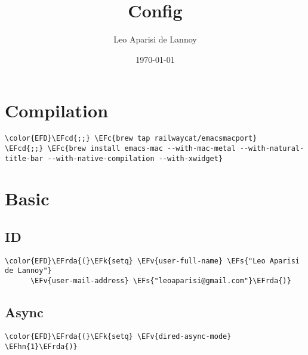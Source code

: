 \documentclass[12pt]{article}
\author{Leo Aparisi de Lannoy}
\date{\today}
\title{Config}
\theoremstyle{plain}%
\theoremstyle{definition}
\theoremstyle{remark}
\newcommand{\EFc}[1]{\textcolor{EFc}{#1}} %
\newcommand{\EFcd}[1]{\textcolor{EFcd}{#1}} %
\newcommand{\EFs}[1]{\textcolor{EFs}{#1}} %
\newcommand{\EFk}[1]{\textcolor{EFk}{#1}} %
\newcommand{\EFv}[1]{\textcolor{EFv}{#1}} %
\newcommand{\EFhn}[1]{\textcolor{EFhn}{\textbf{#1}}} %
\newcommand{\EFrda}[1]{\textcolor{EFrda}{#1}} %
\begin{document}
\maketitle
\tableofcontents

\section{Compilation}
\label{sec:org1126170}
\begin{Code}
\begin{Verbatim}
\color{EFD}\EFcd{;;} \EFc{brew tap railwaycat/emacsmacport}
\EFcd{;;} \EFc{brew install emacs-mac --with-mac-metal --with-natural-title-bar --with-native-compilation --with-xwidget}
\end{Verbatim}
\end{Code}
\section{Basic}
\label{sec:orgede7604}
\subsection{ID}
\label{sec:orgdadafa4}
\begin{Code}
\begin{Verbatim}
\color{EFD}\EFrda{(}\EFk{setq} \EFv{user-full-name} \EFs{"Leo Aparisi de Lannoy"}
      \EFv{user-mail-address} \EFs{"leoaparisi@gmail.com"}\EFrda{)}
\end{Verbatim}
\end{Code}
\subsection{Async}
\label{sec:org7fd86d6}
\begin{Code}
\begin{Verbatim}
\color{EFD}\EFrda{(}\EFk{setq} \EFv{dired-async-mode} \EFhn{1}\EFrda{)}
\end{Verbatim}
\end{Code}
\end{document}
